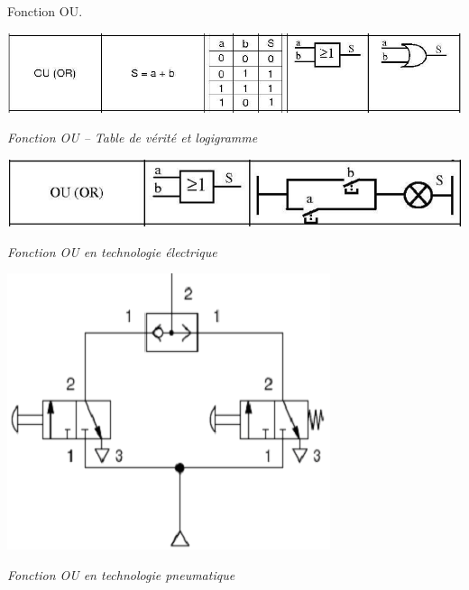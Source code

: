 \documentclass[11pt,oneside]{article}
\begin{document}
\begin{exemple}
Fonction OU.

\begin{minipage}[c]{.3\linewidth}
\begin{center}
\includegraphics[width=.9\textwidth]{png/ou_logi}

\textit{Fonction OU -- Table de vérité et logigramme}
\end{center}
\end{minipage} \hfill
\begin{minipage}[c]{.3\linewidth}
\begin{center}
\includegraphics[width=.9\textwidth]{png/ou_elec}

\textit{Fonction OU en technologie électrique}
\end{center}
\end{minipage} \hfill
\begin{minipage}[c]{.3\linewidth}
\begin{center}
\includegraphics[width=.9\textwidth]{png/ou_pneu}

\textit{Fonction OU en technologie pneumatique}
\end{center}
\end{minipage}
\end{exemple}
\end{document}

